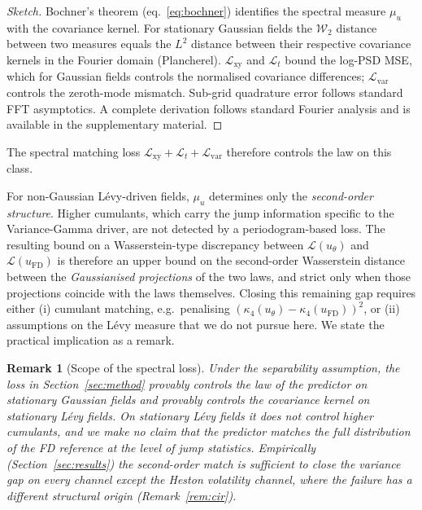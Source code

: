 \documentclass[review,12pt]{elsarticle}
\newtheorem{remark}{Remark}
\begin{document}
\begin{proof}[Sketch]
Bochner's theorem (eq.~\ref{eq:bochner}) identifies the spectral
measure \(\mu_u\) with the covariance kernel. For stationary
Gaussian fields the \(\mathcal{W}_2\) distance between two
measures equals the \(L^2\) distance between their respective
covariance kernels in the Fourier domain (Plancherel).
\(\mathcal{L}_{\mathrm{xy}}\) and \(\mathcal{L}_{t}\) bound
the log-PSD MSE, which for Gaussian fields controls the
normalised covariance differences; \(\mathcal{L}_{\mathrm{var}}\)
controls the zeroth-mode mismatch. Sub-grid quadrature error
follows standard FFT asymptotics. A complete derivation follows
standard Fourier analysis and is available in the supplementary
material.
\end{proof}


The spectral
matching loss
\(\mathcal L_{\mathrm{xy}} + \mathcal L_t + \mathcal L_{\mathrm{var}}\)
therefore controls the law on this class.

For non-Gaussian L\'evy-driven fields, \(\mu_u\) determines only
the \emph{second-order structure}. Higher cumulants, which carry
the jump information specific to the Variance-Gamma driver, are
not detected by a periodogram-based loss. The resulting bound on
a Wasserstein-type discrepancy between
\(\mathcal L(u_\theta)\) and \(\mathcal L(u_{\mathrm{FD}})\) is
therefore an upper bound on the second-order Wasserstein distance
between the \emph{Gaussianised projections} of the two laws, and
strict only when those projections coincide with the laws
themselves. Closing this remaining gap requires either (i)
cumulant matching, e.g.\ penalising
\((\kappa_4(u_\theta) - \kappa_4(u_{\mathrm{FD}}))^2\), or (ii)
assumptions on the L\'evy measure that we do not pursue here. We
state the practical implication as a remark.

\begin{remark}[Scope of the spectral loss]
\label{rem:scope}
Under the separability assumption, the loss in
Section~\ref{sec:method} provably controls the law of the
predictor on stationary Gaussian fields and provably controls the
covariance kernel on stationary L\'evy fields. On stationary
L\'evy fields it does \emph{not} control higher cumulants, and we
make no claim that the predictor matches the full distribution of
the FD reference at the level of jump statistics. Empirically
(Section~\ref{sec:results}) the second-order match is sufficient
to close the variance gap on every channel except the Heston
volatility channel, where the failure has a different structural
origin (Remark~\ref{rem:cir}).
\end{remark}
\end{document}
